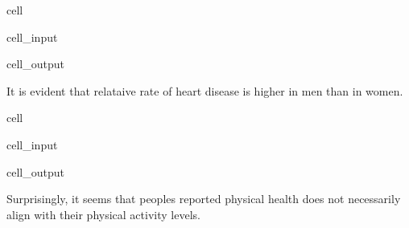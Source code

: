 \documentclass[letterpaper,10pt,english]{jupyterBook}
\begin{document}
\begin{sphinxuseclass}{cell}\begin{sphinxVerbatimInput}

\begin{sphinxuseclass}{cell_input}
\begin{sphinxVerbatim}[commandchars=\\\{\}]
\end{sphinxVerbatim}

\end{sphinxuseclass}\end{sphinxVerbatimInput}
\begin{sphinxVerbatimOutput}

\begin{sphinxuseclass}{cell_output}
\noindent{}

\end{sphinxuseclass}\end{sphinxVerbatimOutput}

\end{sphinxuseclass}
\sphinxAtStartPar
It is evident that relataive rate of heart disease is higher in men than in women.

\begin{sphinxuseclass}{cell}\begin{sphinxVerbatimInput}

\begin{sphinxuseclass}{cell_input}
\begin{sphinxVerbatim}[commandchars=\\\{\}]
\end{sphinxVerbatim}

\end{sphinxuseclass}\end{sphinxVerbatimInput}
\begin{sphinxVerbatimOutput}

\begin{sphinxuseclass}{cell_output}
\noindent{}

\end{sphinxuseclass}\end{sphinxVerbatimOutput}

\end{sphinxuseclass}
\sphinxAtStartPar
Surprisingly, it seems that peoples reported physical health does not necessarily align with their physical activity levels.
\end{document}

